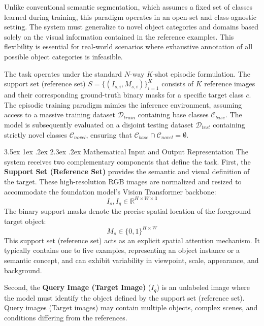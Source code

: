 \documentclass[journal,12pt,onecolumn,draftclsnofoot]{IEEEtran}
\makeatletter
\renewcommand{\section}{\@startsection{section}{1}{\z@}%
    {3.5ex \@plus 1ex \@minus .2ex}%
    {2.3ex \@plus.2ex}%
    {\normalfont\Large\bfseries}}
\makeatother
\begin{document}
Unlike conventional semantic segmentation, which assumes a fixed set of classes learned during training, this paradigm operates in an open-set and class-agnostic setting. The system must generalize to novel object categories and domains based solely on the visual information contained in the reference examples. This flexibility is essential for real-world scenarios where exhaustive annotation of all possible object categories is infeasible.

The task operates under the standard $N$-way $K$-shot episodic formulation. The support set (reference set)  $S = \{(I_{s,i}, M_{s,i})\}_{i=1}^K$ consists of $K$ reference images and their corresponding ground-truth binary masks for a specific target class $c$. The episodic training paradigm mimics the inference environment, assuming access to a massive training dataset $\mathcal{D}_{train}$ containing base classes $\mathcal{C}_{base}$. The model is subsequently evaluated on a disjoint testing dataset $\mathcal{D}_{test}$ containing strictly novel classes $\mathcal{C}_{novel}$, ensuring that $\mathcal{C}_{base} \cap \mathcal{C}_{novel} = \emptyset$.

\section{Mathematical Input and Output Representation}
The system receives two complementary components that define the task. First, the \textbf{Support Set (Reference Set)} provides the semantic and visual definition of the target. These high-resolution RGB images are normalized and resized to accommodate the foundation model's Vision Transformer backbone:
\begin{equation}
    I_s, I_q \in \mathbb{R}^{H \times W \times 3}
\end{equation}
The binary support masks denote the precise spatial location of the foreground target object:
\begin{equation}
    M_s \in \{0, 1\}^{H \times W}
\end{equation}
This support set (reference set) acts as an explicit spatial attention mechanism. It typically contains one to five examples, representing an object instance or a semantic concept, and can exhibit variability in viewpoint, scale, appearance, and background.

Second, the \textbf{Query Image (Target Image)} ($I_q$) is an unlabeled image where the model must identify the object defined by the support set (reference set). Query images (Target images) may contain multiple objects, complex scenes, and conditions differing from the references.
\end{document}
